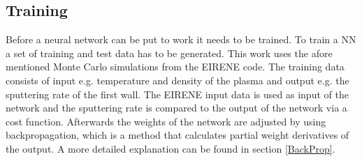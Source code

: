 		\subsection{Training}
			Before a neural network can be put to work it needs to be trained. To train a NN a set of training and test data has to be generated. This work uses the afore mentioned Monte Carlo simulations from the EIRENE code.
			The training data consists of input e.g. temperature and density of the plasma and output e.g. the sputtering rate of the first wall. The EIRENE input data is used as input of the network and the sputtering rate is compared to the output of the network via a cost function. Afterwards the weights of the network are adjusted by using backpropagation, which is a method that calculates partial weight derivatives of the output. A more detailed explanation can be found in section \ref{BackProp}.\\
